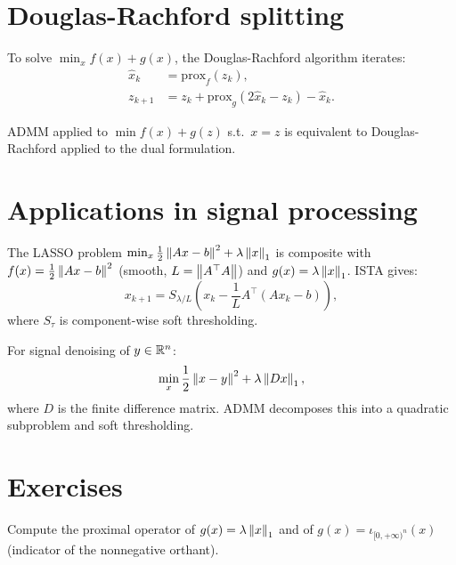 \section{Douglas-Rachford splitting}

\begin{definition}
To solve $\min_x f(x) + g(x)$, the Douglas-Rachford algorithm iterates:
\begin{align*}
  \hat{x}_k &= \mathrm{prox}_f(z_k), \\
  z_{k+1} &= z_k + \mathrm{prox}_g(2\hat{x}_k - z_k) - \hat{x}_k.
\end{align*}
\end{definition}

\begin{proposition}
ADMM applied to $\min f(x) + g(z)$ s.t.\ $x = z$ is equivalent to
Douglas-Rachford applied to the dual formulation.
\end{proposition}

\section{Applications in signal processing}

\begin{example}
The LASSO problem $\min_x \frac{1}{2}\left\| Ax-b \right\|^2 + \lambda\left\| x \right\|_1$
is composite with $f(x) = \frac{1}{2}\left\| Ax-b \right\|^2$ (smooth, $L = \left\| A^\top A \right\|$)
and $g(x) = \lambda\left\| x \right\|_1$. ISTA gives:
\[
  x_{k+1} = S_{\lambda/L}\!\left(
    x_k - \frac{1}{L} A^\top(Ax_k - b)\right),
\]
where $S_\tau$ is component-wise soft thresholding.
\end{example}

\begin{example}
For signal denoising of $y \in \mathbb{R}^n$:
\[
  \min_x \frac{1}{2}\left\| x - y \right\|^2 + \lambda \left\| Dx \right\|_1,
\]
where $D$ is the finite difference matrix. ADMM decomposes this into a
quadratic subproblem and soft thresholding.
\end{example}

\section{Exercises}

\begin{exercise}
Compute the proximal operator of $g(x) = \lambda \left\| x \right\|_1$ and of
$g(x) = \iota_{[0,+\infty)^n}(x)$ (indicator of the nonnegative orthant).
\end{exercise}

